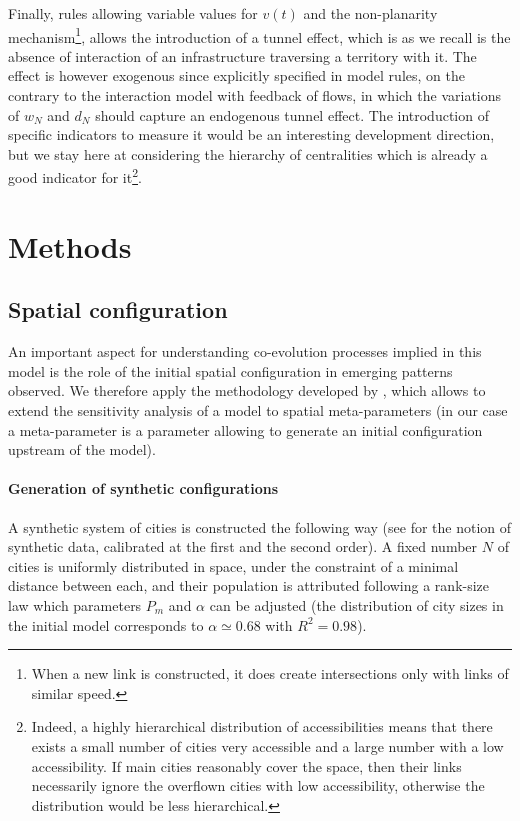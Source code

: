 Finally, rules allowing variable values for $v(t)$ and the non-planarity mechanism\footnote{When a new link is constructed, it does create intersections only with links of similar speed.}, allows the introduction of a tunnel effect, which is as we recall is the absence of interaction of an infrastructure traversing a territory with it. The effect is however exogenous since explicitly specified in model rules, on the contrary to the interaction model with feedback of flows, in which the variations of $w_N$ and $d_N$ should capture an endogenous tunnel effect. The introduction of specific indicators to measure it would be an interesting development direction, but we stay here at considering the hierarchy of centralities which is already a good indicator for it\footnote{Indeed, a highly hierarchical distribution of accessibilities means that there exists a small number of cities very accessible and a large number with a low accessibility. If main cities reasonably cover the space, then their links necessarily ignore the overflown cities with low accessibility, otherwise the distribution would be less hierarchical.}.



\section{Methods}

\subsection{Spatial configuration}


An important aspect for understanding co-evolution processes implied in this model is the role of the initial spatial configuration in emerging patterns observed. We therefore apply the methodology developed by \cite{cottineau2017initial}, which allows to extend the sensitivity analysis of a model to spatial meta-parameters (in our case a meta-parameter is a parameter allowing to generate an initial configuration upstream of the model).


\paragraph{Generation of synthetic configurations}

A synthetic system of cities is constructed the following way (see \cite{raimbault2016generation} for the notion of synthetic data, calibrated at the first and the second order). A fixed number $N$ of cities is uniformly distributed in space, under the constraint of a minimal distance between each, and their population is attributed following a rank-size law which parameters $P_{m}$ and $\alpha$ can be adjusted (the distribution of city sizes in the initial model corresponds to $\alpha\simeq 0.68$ with $R^2=0.98$).


